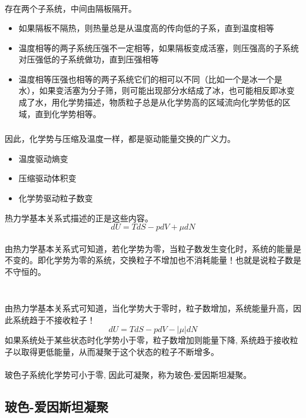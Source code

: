\begin{frame}
  \frametitle{}
  \emf[讨论-1：化学势] \\
   存在两个子系统，中间由隔板隔开。
  \begin{itemize}
    \item 如果隔板不隔热，则热量总是从温度高的传向低的子系，直到温度相等
    \item 温度相等的两子系统压强不一定相等，如果隔板变成活塞，则压强高的子系统对压强低的子系统做功，直到压强相等
    \item 温度相等压强也相等的两子系统它们的相可以不同（比如一个是冰一个是水），如果变活塞为分子筛，则可能出现部分水结成了冰，也可能相反即冰变成了水，用化学势描述，物质粒子总是从化学势高的区域流向化学势低的区域，直到化学势相等。
  \end{itemize}
\end{frame} 

\begin{frame}
  \frametitle{}
  因此，化学势与压缩及温度一样，都是驱动能量交换的广义力。
  \begin{itemize}
    \item 温度驱动熵变
    \item 压缩驱动体积变
    \item 化学势驱动粒子数变
  \end{itemize} 
  热力学基本关系式描述的正是这些内容。
  \[ dU = TdS - pdV + \mu dN \]
  \emf[讨论-2：化学势等于零] \\
  由热力学基本关系式可知道，若化学势为零，当粒子数发生变化时，系统的能量是不变的。即化学势为零的系统，交换粒子不增加也不消耗能量！也就是说粒子数是不守恒的。
\end{frame} 

\begin{frame}
  \frametitle{}
  \emf[讨论-3：化学势小于零] \\
  由热力学基本关系式可知道，当化学势大于零时，粒子数增加，系统能量升高，因此系统趋于不接收粒子！
  \[ dU = TdS - pdV - \left\vert\mu \right\vert dN \]
  如果系统处于某些状态时化学势小于零，粒子数增加则能量下降, 系统趋于接收粒子以取得更低能量，从而凝聚于这个状态的粒子不断增多。\\
 ~~\\ 
  {玻色子系统化学势可小于零}, 因此可凝聚，称为玻色-爱因斯坦凝聚。
\end{frame} 

\subsection{玻色-爱因斯坦凝聚}

